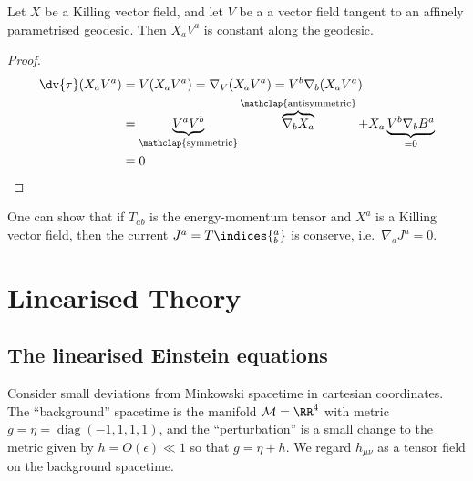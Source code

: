\documentclass{jknotes}
\begin{document}
\begin{lemma}
    Let \(X\) be a Killing vector field, and let \(V\) be a a vector field tangent to an affinely parametrised geodesic. Then \(X_aV^a\) is constant along the geodesic.
\end{lemma}
\begin{proof}
    \begin{align}
        \dv{\tau}(X_aV^a) &= V(X_a V^a) = \nabla_V(X_a V^a) = V^b\nabla_b(X_aV^a) \\
                          &= \underbrace{V^aV^b}_{\mathclap{\text{symmetric}}}\overbrace{\nabla_bX_a}^{\mathclap{\text{antisymmetric}}} + X_a \underbrace{V^b\nabla_b B^a}_{=0} \\
                          &= 0
    \end{align}
\end{proof}

One can show that if \(T_{ab}\) is the energy-momentum tensor and \(X^a\) is a Killing vector field, then the current \(J^a = T\indices{^a_b}\) is conserve, i.e.\ \(\nabla_a J^a = 0\).

\section{Linearised Theory}
\subsection{The linearised Einstein equations}

Consider small deviations from Minkowski spacetime in cartesian coordinates. The ``background'' spacetime is the manifold \(\mathcal{M}=\RR^4\) with metric \(g = \eta = \operatorname{diag}(-1,1,1,1)\), and the ``perturbation'' is a small change to the metric given by \(h = O(\epsilon) \ll 1\) so that \(g = \eta + h\). We regard \(h_{\mu\nu}\) as a tensor field on the background spacetime.
\end{document}
